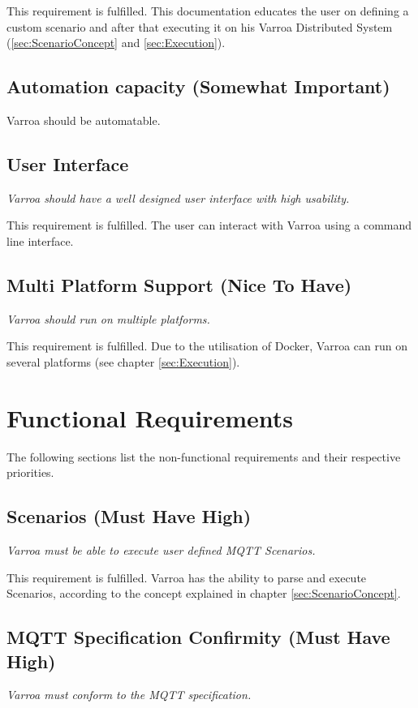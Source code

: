 This requirement is fulfilled. This documentation educates the user on defining a custom scenario and after that executing it on his Varroa Distributed System (\ref{sec:ScenarioConcept} and \ref{sec:Execution}).

\subsection{Automation capacity (Somewhat Important)} 
Varroa should be automatable.


\subsection{User Interface}
\emph{Varroa should have a well designed user interface with high usability.}

This requirement is fulfilled.
The user can interact with Varroa using a command line interface.

\subsection{Multi Platform Support (Nice To Have)}
\emph{Varroa should run on multiple platforms.}

This requirement is fulfilled.
Due to the utilisation of Docker, Varroa can run on several platforms (see chapter \ref{sec:Execution}).

\section{Functional Requirements}
The following sections list the non-functional requirements and their respective priorities.

\subsection{Scenarios (Must Have High)}
\emph{Varroa must be able to execute user defined MQTT Scenarios.}

This requirement is fulfilled.
Varroa has the ability to parse and execute Scenarios, according to the concept explained in chapter \ref{sec:ScenarioConcept}.

\subsection{MQTT Specification Confirmity (Must Have High)}
\emph{Varroa must conform to the MQTT specification.}

